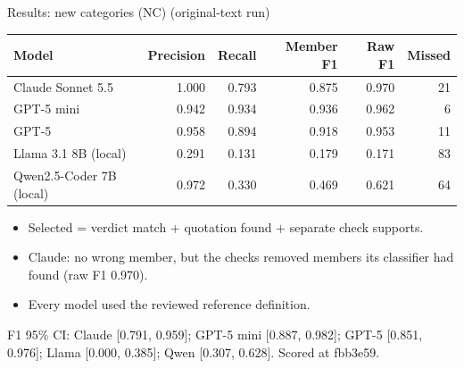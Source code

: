 \documentclass[10pt]{beamer}
\newcommand{\toprule}{\hline}
\newcommand{\midrule}{\hline}
\newcommand{\bottomrule}{\hline}
\newcommand{\src}[1]{\vfill{\tiny\color{bcitgray}#1}}
\begin{document}
\begin{frame}{Results: new categories (NC) (original-text run)}
\small
\begin{tabular}{@{}lrrrrr@{}}
\toprule
Model & Precision & Recall & Member F1 & Raw F1 & Missed\\\midrule
Claude Sonnet 5.5 & 1.000 & 0.793 & 0.875 & 0.970 & 21\\
GPT-5 mini & 0.942 & 0.934 & 0.936 & 0.962 & 6\\
GPT-5 & 0.958 & 0.894 & 0.918 & 0.953 & 11\\
Llama 3.1 8B (local) & 0.291 & 0.131 & 0.179 & 0.171 & 83\\
Qwen2.5-Coder 7B (local) & 0.972 & 0.330 & 0.469 & 0.621 & 64\\
\bottomrule
\end{tabular}\par
\vspace{0.3cm}
\begin{itemize}
\item Selected = verdict match + quotation found + separate check supports.
\item Claude: no wrong member, but the checks removed members its classifier had found (raw F1 0.970).
\item Every model used the reviewed reference definition.
\end{itemize}
\src{F1 95\% CI: Claude [0.791, 0.959]; GPT-5 mini [0.887, 0.982]; GPT-5 [0.851, 0.976]; Llama [0.000, 0.385]; Qwen [0.307, 0.628]. Scored at fbb3e59.}
\end{frame}
\end{document}
